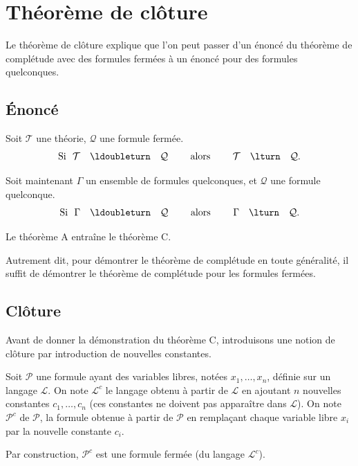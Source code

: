 \documentclass[11pt,class=report,crop=false]{standalone}
\begin{document}
\section{Théorème de clôture}


Le théorème de clôture explique que l'on peut passer d'un énoncé du théorème de complétude avec des formules fermées à un énoncé pour des formules quelconques.

\subsection{Énoncé}



\begin{theoreme}[Théorème A] 
Soit $\mathcal{T}$ une théorie, $\mathcal{Q}$ une formule fermée.
	\[	
		\text{Si } \ \mathcal{T} \quad \ldoubleturn \quad \mathcal{Q}
		\qquad \text{ alors } \qquad 
		\mathcal{T} \quad \lturn \quad \mathcal{Q}.
   \]	
\end{theoreme}


\begin{theoreme}[Théorème C] 
Soit maintenant $\Gamma$ un ensemble de formules quelconques, et $\mathcal{Q}$ une formule quelconque.
	\[	
	\text{Si } \ \Gamma \quad \ldoubleturn \quad \mathcal{Q}
	\qquad \text{ alors } \qquad 
	\Gamma \quad \lturn \quad \mathcal{Q}.
	\]	
\end{theoreme}

\begin{theoreme}
	Le théorème A entraîne le théorème C.
\end{theoreme}

Autrement dit, pour démontrer le théorème de complétude en toute généralité, il suffit de démontrer le théorème de complétude pour les formules fermées.

\subsection{Clôture}

Avant de donner la démonstration du théorème C, introduisons une notion de clôture par introduction de nouvelles constantes.

\begin{definition}
	Soit $\mathcal{P}$ une formule ayant des variables libres, notées $x_1, \ldots, x_n$, définie sur un langage $\mathcal{L}$.
	On note $\mathcal{L}^c$ le langage obtenu à partir de $\mathcal{L}$ en ajoutant $n$ nouvelles constantes $c_1, \ldots, c_n$ (ces constantes ne doivent pas apparaître dans $\mathcal{L}$).
	On note $\mathcal{P}^c$  de $\mathcal{P}$, la formule obtenue à partir de $\mathcal{P}$ en remplaçant chaque variable libre $x_i$ par la nouvelle constante $c_i$.
\end{definition}
Par construction, $\mathcal{P}^c$ est une formule fermée (du langage $\mathcal{L}^c$).
\end{document}
